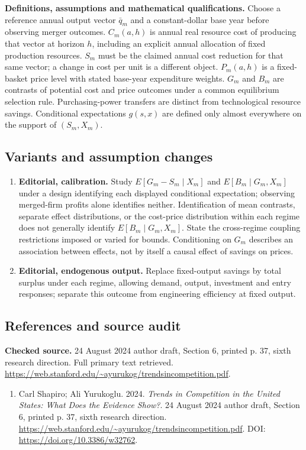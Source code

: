 \documentclass[11pt,a4paper]{article}
\begin{document}
\textbf{Definitions, assumptions and mathematical qualifications.} Choose a reference annual output vector \(\bar q_m\) and a constant-dollar base year before observing merger outcomes. \(C_m(a,h)\) is annual real resource cost of producing that vector at horizon \(h\), including an explicit annual allocation of fixed production resources. \(S_m\) must be the claimed annual cost reduction for that same vector; a change in cost per unit is a different object. \(P_m(a,h)\) is a fixed-basket price level with stated base-year expenditure weights. \(G_m\) and \(B_m\) are contrasts of potential cost and price outcomes under a common equilibrium selection rule. Purchasing-power transfers are distinct from technological resource savings. Conditional expectations \(g(s,x)\) are defined only almost everywhere on the support of \((S_m,X_m)\).
\subsection*{Variants and assumption changes}
\begin{enumerate}
\item \textbf{Editorial, calibration.} Study \(E[G_m-S_m\mid X_m]\) and \(E[B_m\mid G_m,X_m]\) under a design identifying each displayed conditional expectation; observing merged-firm profits alone identifies neither. Identification of mean contrasts, separate effect distributions, or the cost-price distribution within each regime does not generally identify \(E[B_m\mid G_m,X_m]\). State the cross-regime coupling restrictions imposed or varied for bounds. Conditioning on \(G_m\) describes an association between effects, not by itself a causal effect of savings on prices.
\item \textbf{Editorial, endogenous output.} Replace fixed-output savings by total surplus under each regime, allowing demand, output, investment and entry responses; separate this outcome from engineering efficiency at fixed output.
\end{enumerate}
\subsection*{References and source audit}
\textbf{Checked source.} 24 August 2024 author draft, Section 6, printed p. 37, sixth research direction. Full primary text retrieved. \url{https://web.stanford.edu/~ayurukog/trendsincompetition.pdf}.
\begin{enumerate}\raggedright
\item\hypertarget{definitions:source:30007676:1}{} Carl Shapiro; Ali Yurukoglu. 2024. \emph{Trends in Competition in the United States: What Does the Evidence Show?}. 24 August 2024 author draft, Section 6, printed p. 37, sixth research direction.
\url{https://web.stanford.edu/~ayurukog/trendsincompetition.pdf}.
DOI: \url{https://doi.org/10.3386/w32762}.
\end{enumerate}
\end{document}
